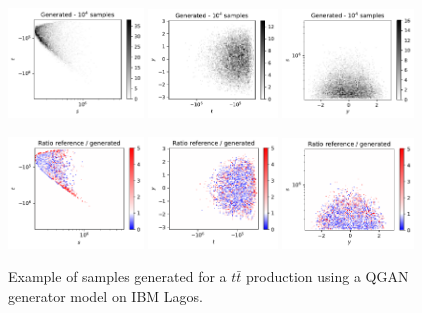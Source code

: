 \documentclass[twocolumn,preprintnumbers,superscriptaddress]{revtex4-2}
\begin{document}
\begin{figure}

  \includegraphics[width=0.32\textwidth]{plots/hardware_1k/ibm_lagos/s-t_FAKE_IBM_10k.pdf}%
  \includegraphics[width=0.305\textwidth]{plots/hardware_1k/ibm_lagos/t-y_FAKE_IBM_10k.pdf}%
  \includegraphics[width=0.31\textwidth]{plots/hardware_1k/ibm_lagos/y-s_FAKE_IBM_10k.pdf}

  \includegraphics[width=0.32\textwidth]{plots/hardware_1k/ibm_lagos/s-t_RATIO_IBM_10k.pdf}%
  \includegraphics[width=0.305\textwidth]{plots/hardware_1k/ibm_lagos/t-y_RATIO_IBM_10k.pdf}%
  \includegraphics[width=0.31\textwidth]{plots/hardware_1k/ibm_lagos/y-s_RATIO_IBM_10k.pdf}

  \caption{\label{fig:ibm}Example of samples generated for a $t\bar{t}$
    production using a QGAN generator model on IBM Lagos.}
\end{figure}
\end{document}
